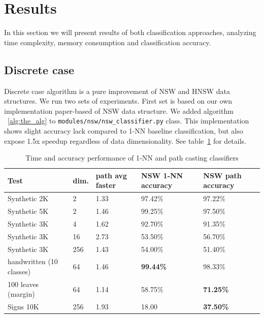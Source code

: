 \section{Results}\label{sec:METHODRESULTS}


In this section we will present results of both classification approaches, analyzing time complexity, memory consumption and classification accuracy.

\subsection{Discrete case}

Discrete case algorithm is a pure improvement of NSW and HNSW data structures. We run two sets of experiments. First set is based on our own implementation paper-based \cite{nsw} of NSW data structure. We added algorithm ~\ref{alg:the_alg} to \texttt{modules/nsw/nsw\_classifier.py} class. This implementation shows slight accuracy lack compared to 1-NN baseline classification, but also expose 1.5x speedup regardless of data dimensionality. See table~\ref{tab:nsw} for details.

\begin{table}
\caption{Time and accuracy performance of 1-NN and path casting classifiers}
\label{tab:nsw}
\centering
\begin{tabular}{ | p{20mm} | p{5mm} | p{10mm} | p{10mm} | p{10mm} | }
\hline
    \textbf{Test}
  & \textbf{dim.}
  & \textbf{path avg faster} 
  & \textbf{NSW 1-NN accuracy}
  & \textbf{NSW path accuracy} \\
 \hline
 Synthetic 2K & 2 & 1.33 & 97.42\% & 97.22\% \\ \hline
 Synthetic 5K & 2 & 1.46 & 99.25\% & 97.50\% \\ \hline
 Synthetic 3K & 4 & 1.62 & 92.70\% & 91.35\% \\ \hline
 Synthetic 3K & 16 & 2.73 & 53.50\% & 56.70\% \\ \hline
 Synthetic 3K & 256 & 1.43 & 54.00\% & 51.40\% \\ \hline
 handwritten (10 classes) \cite{mnist} & 64 & 1.46 & \textbf{99.44\%} & 98.33\% \\ \hline
 100 leaves (margin) \cite{100leaves} & 64 & 1.14 & 58.75\% & \textbf{71.25\%} \\ \hline
 Signs 10K \cite{signsdataset} & 256 & 1.93 & 18.00 & \textbf{37.50\%} \\ \hline
\end{tabular}
\end{table}

